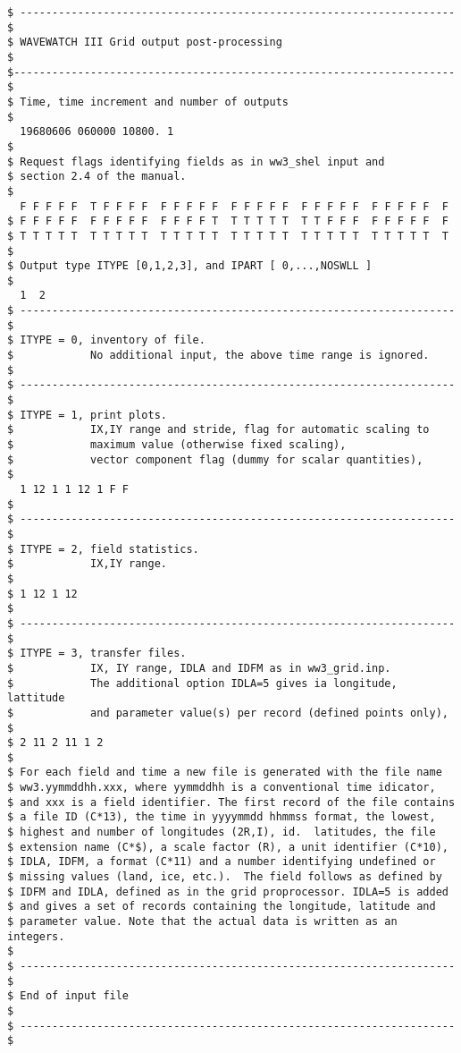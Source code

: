 \begin{verbatim}
$ -------------------------------------------------------------------- $
$ WAVEWATCH III Grid output post-processing                            $
$--------------------------------------------------------------------- $
$ Time, time increment and number of outputs
$
  19680606 060000 10800. 1
$
$ Request flags identifying fields as in ww3_shel input and
$ section 2.4 of the manual.
$
  F F F F F  T F F F F  F F F F F  F F F F F  F F F F F  F F F F F  F
$ F F F F F  F F F F F  F F F F T  T T T T T  T T F F F  F F F F F  F
$ T T T T T  T T T T T  T T T T T  T T T T T  T T T T T  T T T T T  T
$
$ Output type ITYPE [0,1,2,3], and IPART [ 0,...,NOSWLL ]
$
  1  2
$ -------------------------------------------------------------------- $
$ ITYPE = 0, inventory of file.
$            No additional input, the above time range is ignored.
$
$ -------------------------------------------------------------------- $
$ ITYPE = 1, print plots.
$            IX,IY range and stride, flag for automatic scaling to
$            maximum value (otherwise fixed scaling),
$            vector component flag (dummy for scalar quantities),
$
  1 12 1 1 12 1 F F
$
$ -------------------------------------------------------------------- $
$ ITYPE = 2, field statistics.
$            IX,IY range.
$
$ 1 12 1 12
$
$ -------------------------------------------------------------------- $
$ ITYPE = 3, transfer files.
$            IX, IY range, IDLA and IDFM as in ww3_grid.inp.
$            The additional option IDLA=5 gives ia longitude, lattitude 
$            and parameter value(s) per record (defined points only),
$
$ 2 11 2 11 1 2
$
$ For each field and time a new file is generated with the file name
$ ww3.yymmddhh.xxx, where yymmddhh is a conventional time idicator,
$ and xxx is a field identifier. The first record of the file contains
$ a file ID (C*13), the time in yyyymmdd hhmmss format, the lowest,
$ highest and number of longitudes (2R,I), id.  latitudes, the file
$ extension name (C*$), a scale factor (R), a unit identifier (C*10),
$ IDLA, IDFM, a format (C*11) and a number identifying undefined or
$ missing values (land, ice, etc.).  The field follows as defined by
$ IDFM and IDLA, defined as in the grid proprocessor. IDLA=5 is added
$ and gives a set of records containing the longitude, latitude and
$ parameter value. Note that the actual data is written as an integers.
$
$ -------------------------------------------------------------------- $
$ End of input file                                                    $
$ -------------------------------------------------------------------- $
\end{verbatim}
